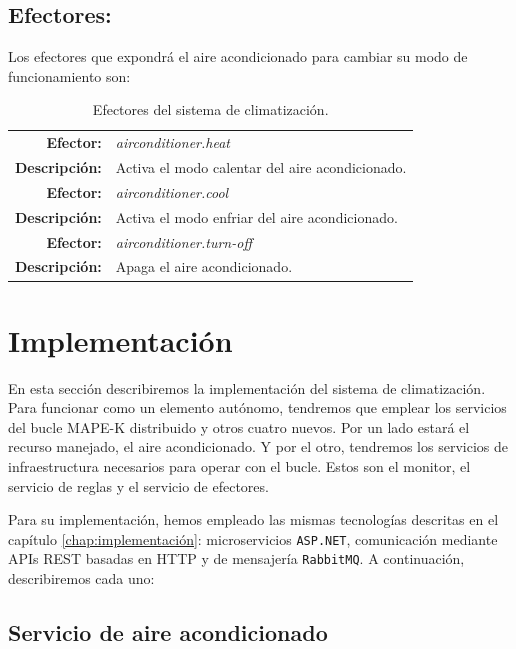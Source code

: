 \subsection{Efectores:}

Los efectores que expondrá el aire acondicionado para cambiar su modo de funcionamiento son:

\begin{table}[htb]
  \centering

  \begin{tabular}{|r p{11.5cm}|}
    \hline
    \textbf{Efector:} & \emph{airconditioner.heat}  \\
    \textbf{Descripción:} & Activa el modo calentar del aire acondicionado. \\
    \hline
    \textbf{Efector:} & \emph{airconditioner.cool}  \\
    \textbf{Descripción:} & Activa el modo enfriar del aire acondicionado. \\
    \hline
    \textbf{Efector:} & \emph{airconditioner.turn-off}  \\
    \textbf{Descripción:} & Apaga el aire acondicionado. \\
    \hline
  \end{tabular}

  \caption{Efectores del sistema de climatización.}
    \label{tab:climatisation-effectors}
\end{table}

\section{Implementación}

En esta sección describiremos la implementación del sistema de climatización. Para funcionar como un elemento autónomo, tendremos que emplear los servicios del bucle MAPE-K distribuido y otros cuatro nuevos. Por un lado estará el recurso manejado, el aire acondicionado. Y por el otro, tendremos los servicios de infraestructura necesarios para operar con el bucle. Estos son el monitor, el servicio de reglas y el servicio de efectores.

Para su implementación, hemos empleado las mismas tecnologías descritas en el capítulo \ref{chap:implementación}: microservicios \texttt{ASP.NET}, comunicación mediante APIs REST basadas en HTTP y  de mensajería \texttt{RabbitMQ}. A continuación, describiremos cada uno:

\subsection{Servicio de aire acondicionado}

